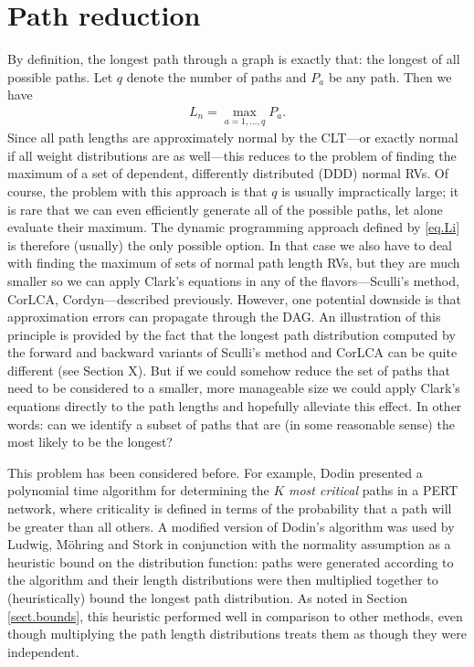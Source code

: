 \documentclass[12pt]{article}
\begin{document}

\section{Path reduction}
\label{sect.path_reduction}

By definition, the longest path through a graph is exactly that: the longest of all possible paths. Let $q$ denote the number of paths and $P_a$ be any path. Then we have
\begin{align}
  \label{eq.lp_definition}
  L_n = \max_{a = 1, \dots, q} P_a.
\end{align}
Since all path lengths are approximately normal by the CLT---or exactly normal if all weight distributions are as well---this reduces to the problem of finding the maximum of a set of dependent, differently distributed (DDD) normal RVs. Of course, the problem with this approach is that $q$ is usually impractically large; it is rare that we can even efficiently generate all of the possible paths, let alone evaluate their maximum. The dynamic programming approach defined by \eqref{eq.Li} is therefore (usually) the only possible option. In that case we also have to deal with finding the maximum of sets of normal path length RVs, but they are much smaller so we can apply Clark's equations in any of the flavors---Sculli's method, CorLCA, Cordyn---described previously. However, one potential downside is that approximation errors can propagate through the DAG. An illustration of this principle is provided by the fact that the longest path distribution computed by the forward and backward variants of Sculli's method and CorLCA can be quite different (see Section X). But if we could somehow reduce the set of paths that need to be considered to a smaller, more manageable size we could apply Clark's equations directly to the path lengths and hopefully alleviate this effect. In other words: can we identify a subset of paths that are (in some reasonable sense) the most likely to be the longest?

This problem has been considered before. For example, Dodin \cite{dod84} presented a polynomial time algorithm for determining the $K$ {\em most critical} paths in a PERT network, where criticality is defined in terms of the probability that a path will be greater than all others. A modified version of Dodin's algorithm was used by Ludwig, M{\"o}hring and Stork \cite{lud01} in conjunction with the normality assumption as a heuristic bound on the distribution function: paths were generated according to the algorithm and their length distributions were then multiplied together to (heuristically) bound the longest path distribution. As noted in Section \ref{sect.bounds}, this heuristic performed well in comparison to other methods, even though multiplying the path length distributions treats them as though they were independent.
\end{document}
